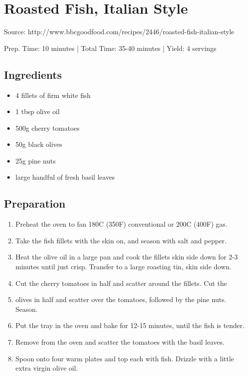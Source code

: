 \section{Roasted Fish, Italian Style}

Source: http://www.bbcgoodfood.com/recipes/2446/roasted-fish-italian-style

\begin{center}
Prep. Time: 10 minutes |
Total Time: 35-40 minutes | 
Yield: 4 servings
\end{center}

\subsection{Ingredients}
\begin{itemize}
    \item 4 fillets of firm white fish
    \item 1 tbsp olive oil 
    \item 500g cherry tomatoes 
    \item 50g black olives 
    \item 25g pine nuts 
    \item large handful of fresh basil leaves
\end{itemize}

\subsection{Preparation}
\begin{enumerate}
    \item Preheat the oven to fan 180C (350F) conventional or 200C (400F) gas.
    \item Take the fish fillets with the skin on, and season with salt and pepper.
    \item Heat the olive oil in a large pan and cook the fillets skin side down for 2-3 minutes until just crisp. Transfer to a large roasting tin, skin side down.
    \item Cut the cherry tomatoes in half and scatter around the fillets. Cut the
    \item olives in half and scatter over the tomatoes, followed by the pine nuts. Season.
    \item Put the tray in the oven and bake for 12-15 minutes, until the fish is tender. 
    \item Remove from the oven and scatter the tomatoes with the basil leaves.
    \item Spoon onto four warm plates and top each with fish. Drizzle with a little extra virgin olive oil.
\end{enumerate}


